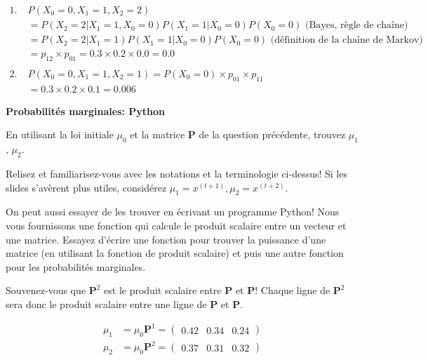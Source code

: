 \begin{Exercice}[15 minutes]
\begin{solution}
\begin{align*}
    1. \; &P(X_0=0,X_1=1, X_2=2) \\ 
    &= P(X_2=2|X_1=1,X_0=0)P(X_1=1|X_0=0)P(X_0 =0) \text{ (Bayes, règle de chaîne)}\\
    &= P(X_2=2|X_1=1)P(X_1=1|X_0=0)P(X_0=0) \text{ (définition de la chaîne de Markov)}\\ 
    &=p_{12} \times p_{01} = 0.3 \times 0.2 \times 0.0 = 0.0\\
    \\
    2. \; & P(X_0=0,X_1=1, X_2=1)=P(X_0 =0)\times p_{01} \times p_{11}\\
    &= 0.3 \times 0.2\times 0.1 = 0.006
\end{align*}
\end{solution}

\end{Exercice}

\begin{Exercice}[10 minutes]\textbf{Probabilités marginales: Python}

En utilisant la loi initiale $\mu_0$ et la matrice \textbf{P} de la question précédente, trouvez $\mu_1$, $\mu_2$.

\begin{conseil}
    Relisez et familiarisez-vous avec les notations et la terminologie ci-dessus! Si les slides s'avèrent plus utiles, considérez $\mu_1 = x^{(t+1)}, \mu_2 = x^{(t+2)}$.
\end{conseil}

On peut aussi essayer de les trouver en écrivant un programme Python! Nous vous fournissons une fonction qui calcule le produit scalaire entre un vecteur et une matrice. Essayez d'écrire une fonction pour trouver la puissance d'une matrice (en utilisant la fonction de produit scalaire) et puis une autre fonction pour les probabilités marginales.



\begin{conseil}
    Souvenez-vous que $\mathbf{P}^2$ est le produit scalaire entre $\mathbf{P}$ et $\mathbf{P}$! Chaque ligne de  $\mathbf{P}^2$ sera donc le produit scalaire entre une ligne de $\mathbf{P}$ et $\mathbf{P}$.
\end{conseil}
\begin{solution}
\begin{align}
\mu_1 &= \mu_0 \mathbf{P}^1 =
\left(\begin{matrix}
0.42 & 0.34 & 0.24
\end{matrix}\right)\\
\mu_2 &= \mu_0 \mathbf{P}^2 =
\left(\begin{matrix}
0.37 & 0.31 & 0.32
\end{matrix}\right) 
\end{align}



\end{solution}

\end{Exercice}

